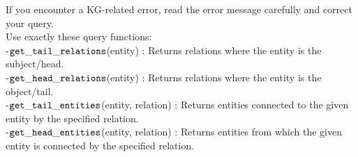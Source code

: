 \begin{tcolorbox}[colback=white, colframe=black, title=Server instruction template for KG-R1, boxrule=0.5pt, left=2mm, right=2mm, top=0mm, bottom=0.5mm]
\footnotesize
\label{tab:kg_server_instruction}
If you encounter a KG-related error, read the error message carefully and correct your query.\\[0.75ex]
Use exactly these query functions: \\
-$\mathtt{get\_tail\_relations}$(entity) : Returns relations where the entity is the subject/head. \\
-$\mathtt{get\_head\_relations}$(entity) : Returns relations where the entity is the object/tail. \\
-$\mathtt{get\_tail\_entities}$(entity, relation) : Returns entities connected to the given entity by the specified relation. \\
-$\mathtt{get\_head\_entities}$(entity, relation) : Returns entities from which the given entity is connected by the specified relation. \\
\end{tcolorbox}
